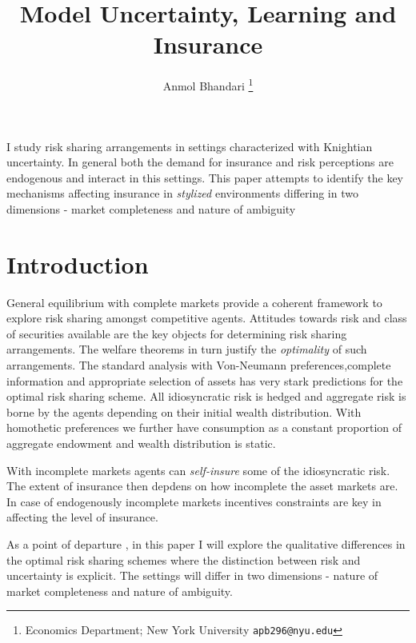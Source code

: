 \documentclass[12pt]{article}
\begin{document}
\title{Model Uncertainty, Learning and Insurance}
\author{Anmol Bhandari \thanks{Economics Department; New York University \texttt{apb296@nyu.edu}}}
\maketitle
\noindent I study risk sharing arrangements in settings characterized with Knightian uncertainty. In general both the demand for insurance and risk perceptions are endogenous and interact in this settings. This paper attempts to identify the key mechanisms affecting insurance in \emph{stylized} environments differing in two dimensions - market completeness and nature of ambiguity
\newpage

\section{Introduction}
\noindent General equilibrium with complete markets provide a coherent framework to explore risk sharing amongst competitive agents. Attitudes towards risk and class of securities available are the key objects for determining  risk sharing arrangements. The welfare theorems in turn justify the \emph{optimality} of such arrangements. The standard analysis with Von-Neumann preferences,complete information and appropriate selection of assets has very stark predictions for the optimal risk sharing scheme. All idiosyncratic risk is hedged and aggregate risk is borne by the agents depending on their initial wealth distribution. With homothetic preferences we further have consumption as a constant proportion of aggregate endowment and wealth distribution is static. 

\vspace{2mm}
\noindent With incomplete markets agents can \emph{self-insure} some of the idiosyncratic risk. The extent of insurance then depdens on how incomplete the asset markets are. In case of endogenously incomplete markets incentives constraints are key in affecting the level of insurance.

\noindent As a point of departure , in this paper I will explore the qualitative differences in the optimal risk sharing schemes where the distinction between risk and uncertainty is explicit. The settings will differ in two dimensions  - nature of market completeness and nature of ambiguity. 

\end{document}
